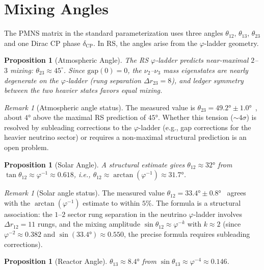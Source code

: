 \documentclass[12pt,a4paper]{article}
\newtheorem{proposition}[theorem]{Proposition}
\theoremstyle{definition}
\theoremstyle{remark}
\newtheorem{remark}[theorem]{Remark}
\begin{document}
\section{Mixing Angles}
\label{sec:mixing}

The PMNS matrix in the standard parameterization uses three angles
$\theta_{12}$, $\theta_{13}$, $\theta_{23}$ and one Dirac CP phase
$\delta_{\mathrm{CP}}$.  In RS, the angles arise from the
$\varphi$-ladder geometry.

\begin{proposition}[Atmospheric Angle]
\label{prop:theta23}
The RS $\varphi$-ladder predicts near-maximal $2$--$3$ mixing:
$\theta_{23} \approx 45^\circ$.  Since $\mathrm{gap}(0) = 0$, the
$\nu_2$--$\nu_3$ mass eigenstates are nearly degenerate on the
$\varphi$-ladder (rung separation $\Delta r_{23} = 8$), and ledger
symmetry between the two heavier states favors equal mixing.
\end{proposition}

\begin{remark}[Atmospheric angle status]
The measured value is $\theta_{23} = 49.2° \pm 1.0°$~\cite{PDG2024},
about $4°$ above the maximal RS prediction of $45°$.  Whether this
tension ($\sim 4\sigma$) is resolved by subleading corrections to the
$\varphi$-ladder (e.g., gap corrections for the heavier neutrino sector)
or requires a non-maximal structural prediction is an open problem.
\end{remark}

\begin{proposition}[Solar Angle]
\label{prop:theta12}
A structural estimate gives $\theta_{12} \approx 32°$ from
$\tan\theta_{12} \approx \varphi^{-1} \approx 0.618$, i.e.,
$\theta_{12} \approx \arctan(\varphi^{-1}) \approx 31.7°$.
\end{proposition}

\begin{remark}[Solar angle status]
The measured value $\theta_{12} = 33.4° \pm 0.8°$~\cite{PDG2024}
agrees with the $\arctan(\varphi^{-1})$ estimate to within $5\%$.
The formula is a structural association: the $1$--$2$ sector rung
separation in the neutrino $\varphi$-ladder involves $\Delta r_{12} = 11$
rungs, and the mixing amplitude $\sin\theta_{12} \approx \varphi^{-k}$
with $k \approx 2$ (since $\varphi^{-2} \approx 0.382$ and
$\sin(33.4°) \approx 0.550$, the precise formula requires subleading
corrections).
\end{remark}

\begin{proposition}[Reactor Angle]
\label{prop:theta13}
$\theta_{13} \approx 8.4°$ from $\sin\theta_{13} \approx \varphi^{-4}
\approx 0.146$.
\end{proposition}
\end{document}
